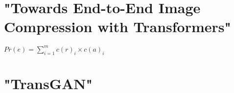 





\newpage
\section{"Towards End-to-End Image Compression with Transformers"}




\begin{center}
$Pr(e) = \displaystyle\sum_{i=1}^{m} c(r)_i \times c(a)_i $
\end{center}


\section{"TransGAN"}
